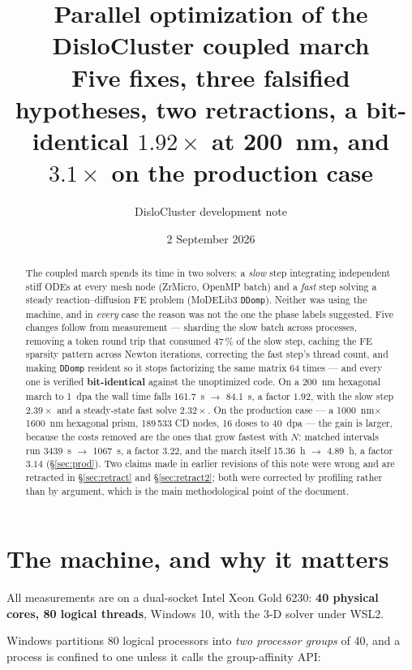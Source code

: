 \documentclass[11pt]{article}
\title{Parallel optimization of the DisloCluster coupled march\\
       \large Five fixes, three falsified hypotheses, two retractions,
       a bit-identical $1.92\times$ at \SI{200}{\nano\meter},
       and $3.1\times$ on the production case}
\author{DisloCluster development note}
\date{2 September 2026}
\begin{document}
\maketitle

\begin{abstract}
The coupled march spends its time in two solvers: a \emph{slow} step
integrating independent stiff ODEs at every mesh node (ZrMicro, OpenMP batch)
and a \emph{fast} step solving a steady reaction--diffusion FE problem
(MoDELib3 \texttt{DDomp}). Neither was using the machine, and in \emph{every}
case the reason was not the one the phase labels suggested. Five changes follow
from measurement --- sharding the slow batch across processes, removing a token
round trip that consumed 47\,\% of the slow step, caching the FE sparsity
pattern across Newton iterations, correcting the fast step's thread count, and
making \texttt{DDomp} resident so it stops factorizing the same matrix 64 times
--- and every one is verified \textbf{bit-identical} against the unoptimized
code. On a \SI{200}{\nano\meter} hexagonal march to \SI{1}{dpa} the wall time
falls \SI{161.7}{\second} $\rightarrow$ \SI{84.1}{\second}, a factor
$\mathbf{1.92}$, with the slow step $2.39\times$ and a steady-state fast solve
$2.32\times$. On the production case --- a
\SI{1000}{\nano\meter}$\times$\SI{1600}{\nano\meter} hexagonal prism,
189\,533 CD nodes, 16 doses to \SI{40}{dpa} --- the gain is larger, because the
costs removed are the ones that grow fastest with $N$: matched intervals run
\SI{3439}{\second} $\rightarrow$ \SI{1067}{\second}, a factor
$\mathbf{3.22}$, and the march itself \SI{15.36}{\hour} $\rightarrow$
\SI{4.89}{\hour}, a factor $\mathbf{3.14}$ (\S\ref{sec:prod}).
Two claims made in earlier revisions of this note were wrong and
are retracted in \S\ref{sec:retract} and \S\ref{sec:retract2}; both were
corrected by profiling rather than by argument, which is the main methodological
point of the document.
\end{abstract}

\section{The machine, and why it matters}
All measurements are on a dual-socket Intel Xeon Gold 6230: \textbf{40 physical
cores, 80 logical threads}, Windows 10, with the 3-D solver under WSL2.

Windows partitions 80 logical processors into \emph{two processor groups} of 40,
and a process is confined to one unless it calls the group-affinity API:
\end{document}
